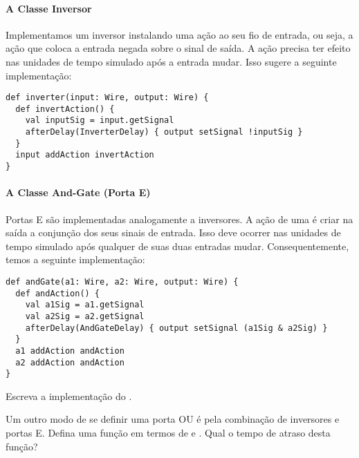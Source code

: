 \paragraph{A Classe Inversor}
Implementamos um inversor instalando uma ação ao seu fio de entrada,
ou seja, a ação que coloca a entrada negada sobre o sinal de saída. A
ação precisa ter efeito nas unidades de tempo
simulado  após a entrada mudar. Isso sugere a
seguinte implementação:

\begin{lstlisting}
def inverter(input: Wire, output: Wire) {
  def invertAction() {
    val inputSig = input.getSignal
    afterDelay(InverterDelay) { output setSignal !inputSig }
  }
  input addAction invertAction
}
\end{lstlisting}

\paragraph{A Classe And-Gate (Porta E)}
Portas E são implementadas analogamente a inversores. A ação de
uma  é criar na saída a conjunção dos seus sinais de
entrada. Isso deve ocorrer nas unidades de tempo
simulado  após qualquer de suas duas entradas
mudar. Consequentemente, temos a seguinte implementação:
\begin{lstlisting}
def andGate(a1: Wire, a2: Wire, output: Wire) {
  def andAction() {
    val a1Sig = a1.getSignal
    val a2Sig = a2.getSignal
    afterDelay(AndGateDelay) { output setSignal (a1Sig & a2Sig) }
  }
  a1 addAction andAction
  a2 addAction andAction
}
\end{lstlisting}

\begin{exercise} Escreva a implementação do .
\end{exercise}

\begin{exercise} Um outro modo de se definir uma porta OU é pela combinação de inversores e portas E.
Defina uma função  em termos de  e . Qual o tempo de atraso 
desta função?
\end{exercise}


